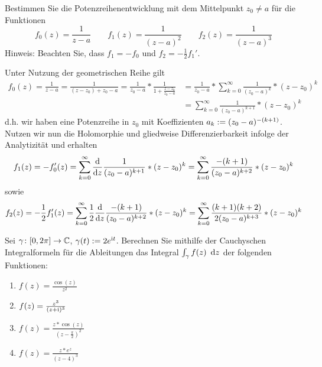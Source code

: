 \begin{exercisePage}
	
	\begin{task}
		Bestimmen Sie die Potenzreihenentwicklung mit dem Mittelpunkt $z_0 \neq a$ für die Funktionen
		\begin{equation*}
			f_0(z) = \frac{1}{z-a} \qquad f_1(z) = \frac{1}{(z-a)^2} \qquad f_2(z) = \frac{1}{(z-a)^3}
		\end{equation*}
		Hinweis: Beachten Sie, dass $f_1 = -f_0$ und $f_2 = -\frac{1}{2} f_1'$.
	\end{task}

	Unter Nutzung der geometrischen Reihe gilt
	\begin{equation*}
		\begin{aligned}
			f_0(z) = \frac{1}{z-a} = \frac{1}{(z-z_0) + z_0 - a} = \frac{1}{z_0 - a} * \frac{1}{1 + \frac{z-z_0}{z_0 - a}} 
			&= \frac{1}{z_0 - a} * \sum_{k=0}^\infty \frac{1}{(z_0 - a)^k} * (z-z_0)^k \\
			&=\sum_{k=0}^\infty \frac{1}{(z_0 - a)^{k+1}} * (z-z_0)^k
		\end{aligned}
	\end{equation*}
	d.h. wir haben eine Potenzreihe in $z_0$ mit Koeffizienten $a_k \mathrel{:=} (z_0 - a)^{-(k+1)}$.
	Nutzen wir nun die Holomorphie und gliedweise Differenzierbarkeit infolge der Analytizität und erhalten
	\begin{equation*}
		f_1(z) = - f_0'(z) 
		= \sum_{k=0}^\infty \frac{\mathrm{d}}{\mathrm{d} z } \frac{1}{(z_0 - a)^{k+1}} * (z-z_0)^k 
		= \sum_{k=0}^\infty \frac{-(k+1)}{(z_0 - a)^{k+2}} * (z-z_0)^k
	\end{equation*}
	sowie
	\begin{equation*}
		f_2(z) = - \frac{1}{2} f_1'(z)
		= \sum_{k=0}^\infty \frac{1}{2} \frac{\mathrm{d}}{\mathrm{d} z } \frac{-(k+1)}{(z_0 - a)^{k+2}} * (z-z_0)^k
		= \sum_{k=0}^\infty \frac{(k+1)(k+2)}{2 (z_0 - a)^{k+3}} * (z-z_0)^k
	\end{equation*}
	
	\begin{task}
		Sei $\gamma \colon [0, 2\pi] \to \mathbb{C}$, $\gamma(t) \mathrel{:=} 2 e^{\mathrm{i} t}$. Berechnen Sie mithilfe der Cauchyschen Integralformeln für die Ableitungen das Integral $\int_\gamma f(z) \enskip \mathrm{d}z$ der folgenden Funktionen:
		\begin{enumerate}
			\item $f(z) = \frac{\cos(z)}{z^2}$
			\item $f(z) = \frac{z^3}{(z+\mathrm{i})^3}$
			\item $f(z) = \frac{z * \cos(z)}{(z - \frac{\pi}{2})^2}$
			\item $f(z) = \frac{z * e^z}{(z-4)^3}$
		\end{enumerate} 
	\end{task}


\end{exercisePage}

